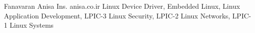 \documentclass[a4paper,12pt]{memoir} %
\begin{document}
\Sep %



\CVCertificateSet
{Fanavaran Anisa Ins.}
{anisa.co.ir}
{Linux Device Driver, Embedded Linux, Linux Application Development, LPIC-3 Linux Security, LPIC-2 Linux Networks, LPIC-1 Linux Systems}


\Sep %




\end{document}
